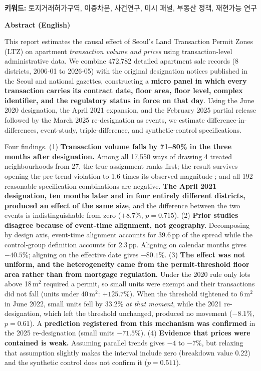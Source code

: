 \vspace{1em}
\noindent\textbf{키워드:} 토지거래허가구역, 이중차분, 사건연구, 미시 패널,
부동산 정책, 재현가능 연구

\vspace{1em}
\begin{center}\textbf{Abstract (English)}\end{center}
\small
This report estimates the causal effect of Seoul's Land Transaction Permit
Zones (LTZ) on apartment \emph{transaction volume and prices} using
transaction-level administrative data. We combine 472,782 detailed apartment
sale records (8 districts, 2006-01 to 2026-05) with the original designation
notices published in the Seoul and national gazettes, constructing a
\textbf{micro panel in which every transaction carries its contract date, floor
area, floor level, complex identifier, and the regulatory status in force on
that day}. Using the June 2020 designation, the April 2021 expansion, and the
February 2025 partial release followed by the March 2025 re-designation as
events, we estimate difference-in-differences, event-study, triple-difference,
and synthetic-control specifications.

Four findings.
(1) \textbf{Transaction volume falls by 71--80\% in the three months after
designation.} Among all 17{,}550 ways of drawing 4 treated neighbourhoods from
27, the true assignment ranks first; the result survives opening the
pre-trend violation to 1.6 times its observed magnitude
\citep{rambachan2023honest}; and all 192 reasonable specification combinations
are negative. \textbf{The April 2021 designation, ten months later and in four
entirely different districts, produced an effect of the same size}, and the
difference between the two events is indistinguishable from zero
($+8.7\%$, $p=0.715$).
(2) \textbf{Prior studies disagree because of event-time alignment, not
geography.} Decomposing by design axis, event-time alignment accounts for
39.6\,pp of the spread while the control-group definition accounts for 2.3\,pp.
Aligning on calendar months gives $-40.5\%$; aligning on the effective date
gives $-80.1\%$.
(3) \textbf{The effect was not uniform, and the heterogeneity came from the
permit-threshold floor area rather than from mortgage regulation.} Under the
2020 rule only lots above 18\,m$^2$ required a permit, so small units were
exempt and their transactions did not fall (units under 40\,m$^2$: $+125.7\%$).
When the threshold tightened to 6\,m$^2$ in June 2022, small units fell by
33.2\% \emph{at that moment}, while the 2021 re-designation, which left the
threshold unchanged, produced no movement ($-8.1\%$, $p=0.61$).
A \textbf{prediction registered from this mechanism was confirmed} in the 2025
re-designation (small units $-71.5\%$).
(4) \textbf{Evidence that prices were contained is weak.} Assuming parallel
trends gives $-4$ to $-7\%$, but relaxing that assumption slightly makes the
interval include zero (breakdown value 0.22) and the synthetic control does not
confirm it ($p=0.511$).

